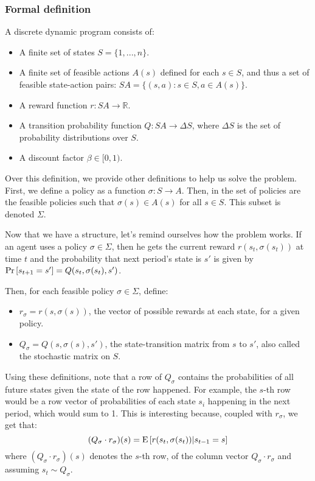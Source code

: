 \subsubsection{Formal definition}

A discrete dynamic program consists of:\begin{itemize}
\item A finite set of states $S = \{1, ..., n\}$.
\item A finite set of feasible actions $A(s)$ defined for each $s\in S$, and thus a set of feasible state-action pairs: $SA = \{(s, a): s\in S, a\in A(s)\}$.
\item A reward function $r:SA\to\mathbb{R}$.
\item A transition probability function $Q:SA\to\Delta S$, where $\Delta S$ is the set of probability distributions over $S$.
\item A discount factor $\beta\in [0,1)$.
\end{itemize}

Over this definition, we provide other definitions to help us solve the problem. First, we define a policy as a function $\sigma:S\to A$. Then, in the set of policies are the feasible policies such that $\sigma(s)\in A(s)$ for all $s\in S$. This subset is denoted $\Sigma$.

Now that we have a structure, let's remind ourselves how the problem works. If an agent uses a policy $\sigma\in\Sigma$, then he gets the current reward $r(s_t, \sigma(s_t))$ at time $t$ and the probability that next period's state is $s'$ is given by $\operatorname{Pr}\left[s_{t+1} = s'\right] = Q(s_t, \sigma(s_t), s')$.

Then, for each feasible policy $\sigma\in\Sigma$, define:\begin{itemize}
\item $r_\sigma = r(s, \sigma(s))$, the vector of possible rewards at each state, for a given policy.
\item $Q_\sigma = Q(s, \sigma(s), s')$, the state-transition matrix from $s$ to $s'$, also called the stochastic matrix on $S$.
\end{itemize}
Using these definitions, note that a row of $Q_\sigma$ contains the probabilities of all future states given the state of the row happened. For example, the $s$-th row would be a row vector of probabilities of each state $s_i$ happening in the next period, which would sum to 1. This is interesting because, coupled with $r_\sigma$, we get that: $$ (Q_\sigma\cdot r_\sigma)(s) = \operatorname{E}\left[r(s_t, \sigma(s_t))\vert s_{t-1} = s\right] $$ where $(Q_\sigma\cdot r_\sigma)(s)$ denotes the $s$-th row, of the column vector $Q_\sigma\cdot r_\sigma$ and assuming $s_t\sim Q_\sigma$.

